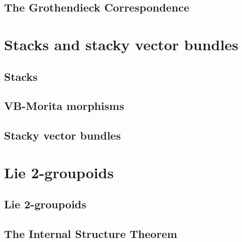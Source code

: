 

\section{The Grothendieck Correspondence}\label{sec:groth-corresp}




\chapter{Stacks and stacky vector bundles}\label{ch:stacks-and-syacky-vb}



\section{Stacks}



\section{VB-Morita morphisms}\label{sec:VB-Morita}



\section{Stacky vector bundles}




\chapter{Lie 2-groupoids}\label{ch:lie-2-gpds}

\section{Lie 2-groupoids}



\section{The Internal Structure Theorem}

